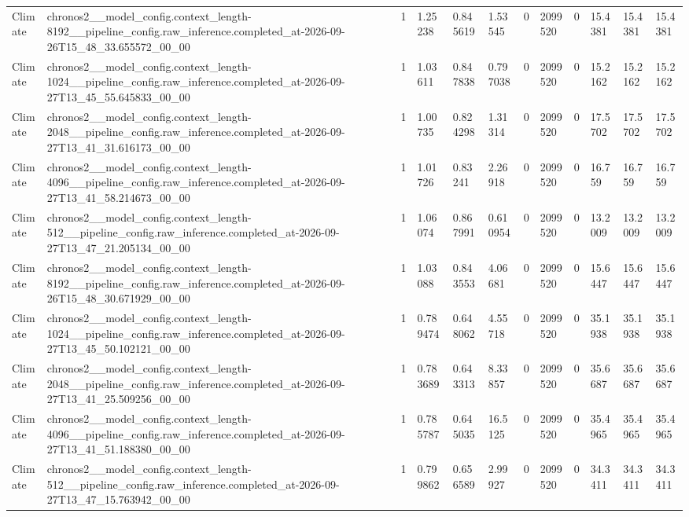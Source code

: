 \begin{tabular}{llllllllllll}
Climate & chronos2\_\_model\_config.context\_length-8192\_\_pipeline\_config.raw\_inference.completed\_at-2026-09-26T15\_48\_33.655572\_00\_00 & 1 & 1.25238 & 0.845619 & 1.53545 & 0 & 2099520 & 0 & 15.4381 & 15.4381 & 15.4381 \\
Climate & chronos2\_\_model\_config.context\_length-1024\_\_pipeline\_config.raw\_inference.completed\_at-2026-09-27T13\_45\_55.645833\_00\_00 & 1 & 1.03611 & 0.847838 & 0.797038 & 0 & 2099520 & 0 & 15.2162 & 15.2162 & 15.2162 \\
Climate & chronos2\_\_model\_config.context\_length-2048\_\_pipeline\_config.raw\_inference.completed\_at-2026-09-27T13\_41\_31.616173\_00\_00 & 1 & 1.00735 & 0.824298 & 1.31314 & 0 & 2099520 & 0 & 17.5702 & 17.5702 & 17.5702 \\
Climate & chronos2\_\_model\_config.context\_length-4096\_\_pipeline\_config.raw\_inference.completed\_at-2026-09-27T13\_41\_58.214673\_00\_00 & 1 & 1.01726 & 0.83241 & 2.26918 & 0 & 2099520 & 0 & 16.759 & 16.759 & 16.759 \\
Climate & chronos2\_\_model\_config.context\_length-512\_\_pipeline\_config.raw\_inference.completed\_at-2026-09-27T13\_47\_21.205134\_00\_00 & 1 & 1.06074 & 0.867991 & 0.610954 & 0 & 2099520 & 0 & 13.2009 & 13.2009 & 13.2009 \\
Climate & chronos2\_\_model\_config.context\_length-8192\_\_pipeline\_config.raw\_inference.completed\_at-2026-09-26T15\_48\_30.671929\_00\_00 & 1 & 1.03088 & 0.843553 & 4.06681 & 0 & 2099520 & 0 & 15.6447 & 15.6447 & 15.6447 \\
Climate & chronos2\_\_model\_config.context\_length-1024\_\_pipeline\_config.raw\_inference.completed\_at-2026-09-27T13\_45\_50.102121\_00\_00 & 1 & 0.789474 & 0.648062 & 4.55718 & 0 & 2099520 & 0 & 35.1938 & 35.1938 & 35.1938 \\
Climate & chronos2\_\_model\_config.context\_length-2048\_\_pipeline\_config.raw\_inference.completed\_at-2026-09-27T13\_41\_25.509256\_00\_00 & 1 & 0.783689 & 0.643313 & 8.33857 & 0 & 2099520 & 0 & 35.6687 & 35.6687 & 35.6687 \\
Climate & chronos2\_\_model\_config.context\_length-4096\_\_pipeline\_config.raw\_inference.completed\_at-2026-09-27T13\_41\_51.188380\_00\_00 & 1 & 0.785787 & 0.645035 & 16.5125 & 0 & 2099520 & 0 & 35.4965 & 35.4965 & 35.4965 \\
Climate & chronos2\_\_model\_config.context\_length-512\_\_pipeline\_config.raw\_inference.completed\_at-2026-09-27T13\_47\_15.763942\_00\_00 & 1 & 0.799862 & 0.656589 & 2.99927 & 0 & 2099520 & 0 & 34.3411 & 34.3411 & 34.3411 \\

\end{tabular}
